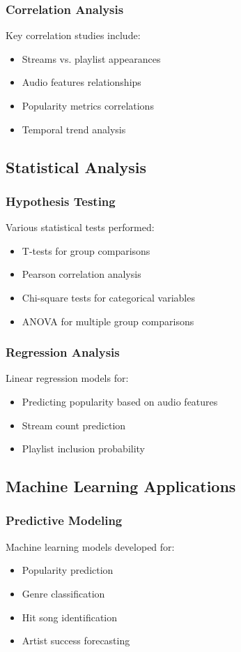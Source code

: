 \documentclass[12pt,a4paper]{article}
\begin{document}
\subsubsection{Correlation Analysis}
Key correlation studies include:
\begin{itemize}
    \item Streams vs. playlist appearances
    \item Audio features relationships
    \item Popularity metrics correlations
    \item Temporal trend analysis
\end{itemize}

\subsection{Statistical Analysis}
\subsubsection{Hypothesis Testing}
Various statistical tests performed:
\begin{itemize}
    \item T-tests for group comparisons
    \item Pearson correlation analysis
    \item Chi-square tests for categorical variables
    \item ANOVA for multiple group comparisons
\end{itemize}

\subsubsection{Regression Analysis}
Linear regression models for:
\begin{itemize}
    \item Predicting popularity based on audio features
    \item Stream count prediction
    \item Playlist inclusion probability
\end{itemize}

\subsection{Machine Learning Applications}
\subsubsection{Predictive Modeling}
Machine learning models developed for:
\begin{itemize}
    \item Popularity prediction
    \item Genre classification
    \item Hit song identification
    \item Artist success forecasting
\end{itemize}
\end{document}
